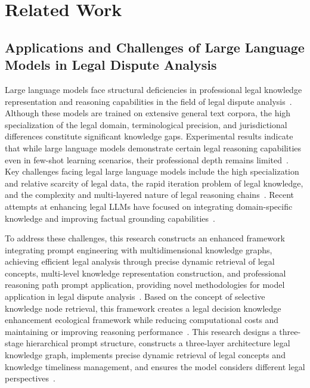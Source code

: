 \documentclass{article}
\theoremstyle{plain}
\theoremstyle{definition}
\begin{document}
\section{Related Work}
\label{sec2}

\subsection{Applications and Challenges of Large Language Models in Legal Dispute Analysis}
\label{sec2.1}

Large language models face structural deficiencies in professional legal knowledge representation and reasoning capabilities in the field of legal dispute analysis~\cite{Lai2023b,Brown2020}. Although these models are trained on extensive general text corpora, the high specialization of the legal domain, terminological precision, and jurisdictional differences constitute significant knowledge gaps. Experimental results indicate that while large language models demonstrate certain legal reasoning capabilities even in few-shot learning scenarios, their professional depth remains limited~\cite{Choi2023}. Key challenges facing legal large language models include the high specialization and relative scarcity of legal data, the rapid iteration problem of legal knowledge, and the complexity and multi-layered nature of legal reasoning chains~\cite{Wang2024}. Recent attempts at enhancing legal LLMs have focused on integrating domain-specific knowledge and improving factual grounding capabilities~\cite{Shi2024a}.

To address these challenges, this research constructs an enhanced framework integrating prompt engineering with multidimensional knowledge graphs, achieving efficient legal analysis through precise dynamic retrieval of legal concepts, multi-level knowledge representation construction, and professional reasoning path prompt application, providing novel methodologies for model application in legal dispute analysis~\cite{Guha2023b}. Based on the concept of selective knowledge node retrieval, this framework creates a legal decision knowledge enhancement ecological framework while reducing computational costs and maintaining or improving reasoning performance~\cite{Dhani2021}. This research designs a three-stage hierarchical prompt structure, constructs a three-layer architecture legal knowledge graph, implements precise dynamic retrieval of legal concepts and knowledge timeliness management, and ensures the model considers different legal perspectives~\cite{Jayakumar2023}.
\end{document}
